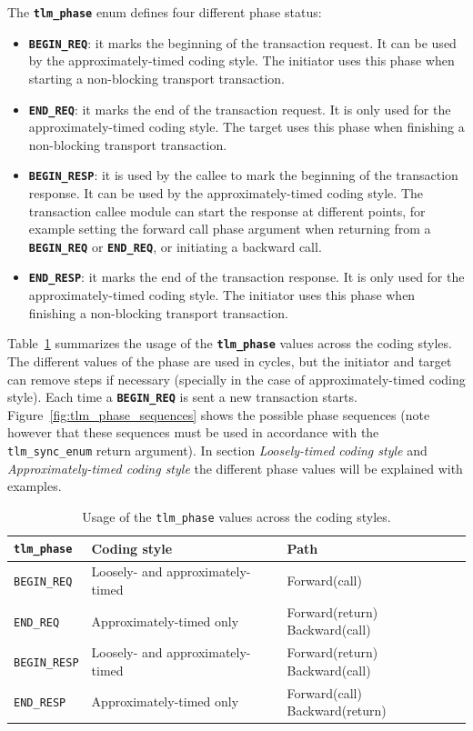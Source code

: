 {The \texttt{\textbf{tlm\_phase}} enum defines four different phase status:
\begin{itemize}
	\item \texttt{\textbf{BEGIN\_REQ}}: it marks the beginning of the transaction request.
	It can be used by the approximately-timed coding style.
	The initiator uses this phase when starting a non-blocking transport transaction.
	\item \texttt{\textbf{END\_REQ}}: it marks the end of the transaction request.
	It is only used for the approximately-timed coding style.
	The target uses this phase when finishing a non-blocking transport transaction.
	\item \texttt{\textbf{BEGIN\_RESP}}: it is used by the callee to mark the beginning of the transaction response.
	It can be used by the approximately-timed coding style.
	The transaction callee module can start the response at different points, for example setting the forward call phase argument when returning from a \texttt{\textbf{BEGIN\_REQ}} or \texttt{\textbf{END\_REQ}}, or initiating a backward call.
	\item \texttt{\textbf{END\_RESP}}: it marks the end of the transaction response.
	It is only used for the approximately-timed coding style.
	The initiator uses this phase when finishing a non-blocking transport transaction.
\end{itemize}
Table~\ref{table:tlm_phase_values} summarizes the usage of the \texttt{\textbf{tlm\_phase}} values across the coding styles.
The different values of the phase are used in cycles, but the initiator and target can remove steps if necessary (specially in the case of approximately-timed coding style).
Each time a \texttt{\textbf{BEGIN\_REQ}} is sent a new transaction starts.
Figure~\ref{fig:tlm_phase_sequences} shows the possible phase sequences (note however that these sequences must be used in accordance with the \texttt{tlm\_sync\_enum} return argument).
In section \emph{Loosely-timed coding style} and \emph{Approximately-timed coding style} the different phase values will be explained with examples.

\begin{table}[h]
	\begin{center}
	\begin{tabular}{|l|l|l|}
		\hline
		\texttt{\textbf{tlm\_phase}} & \textbf{Coding style} & \textbf{Path} \\
		\hline
		\texttt{BEGIN\_REQ} & Loosely- and approximately-timed & Forward(call) \\
		\hline
		\texttt{END\_REQ} & Approximately-timed only & Forward(return) Backward(call) \\
		\hline
		\texttt{BEGIN\_RESP} & Loosely- and approximately-timed & Forward(return) Backward(call) \\
		\hline
		\texttt{END\_RESP} & Approximately-timed only & Forward(call) Backward(return) \\
		\hline
	\end{tabular}
	\end{center}
	\caption{Usage of the \texttt{tlm\_phase} values across the coding styles.}
	\label{table:tlm_phase_values}
\end{table}


}
